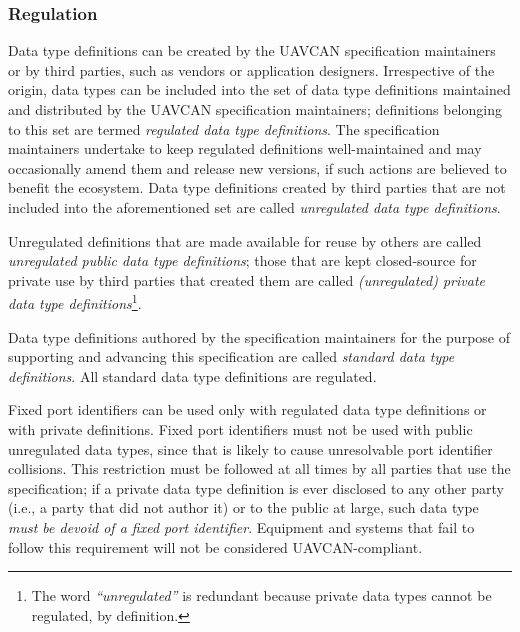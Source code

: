 \subsubsection{Regulation}

Data type definitions can be created by the UAVCAN specification maintainers or by third parties,
such as vendors or application designers.
Irrespective of the origin, data types can be included into the set of data type definitions maintained
and distributed by the UAVCAN specification maintainers;
definitions belonging to this set are termed \emph{regulated data type definitions}.
The specification maintainers undertake to keep regulated definitions well-maintained and may occasionally
amend them and release new versions, if such actions are believed to benefit the ecosystem.
Data type definitions created by third parties that are not included into the aforementioned set are called
\emph{unregulated data type definitions}.

Unregulated definitions that are made available for reuse by others are called
\emph{unregulated public data type definitions};
those that are kept closed-source for private use by third parties that created them are called
\emph{(unregulated) private data type definitions}\footnote{The word \emph{``unregulated''} is redundant
because private data types cannot be regulated, by definition.}.

Data type definitions authored by the specification maintainers for the purpose of supporting and advancing
this specification are called \emph{standard data type definitions}.
All standard data type definitions are regulated.

Fixed port identifiers can be used only with regulated data type definitions or with private definitions.
Fixed port identifiers must not be used with public unregulated data types,
since that is likely to cause unresolvable port identifier collisions.
This restriction must be followed at all times by all parties that use the specification;
if a private data type definition is ever disclosed to any other party (i.e., a party that did not author it)
or to the public at large, such data type \emph{must be devoid of a fixed port identifier}.
Equipment and systems that fail to follow this requirement will not be considered UAVCAN-compliant.

